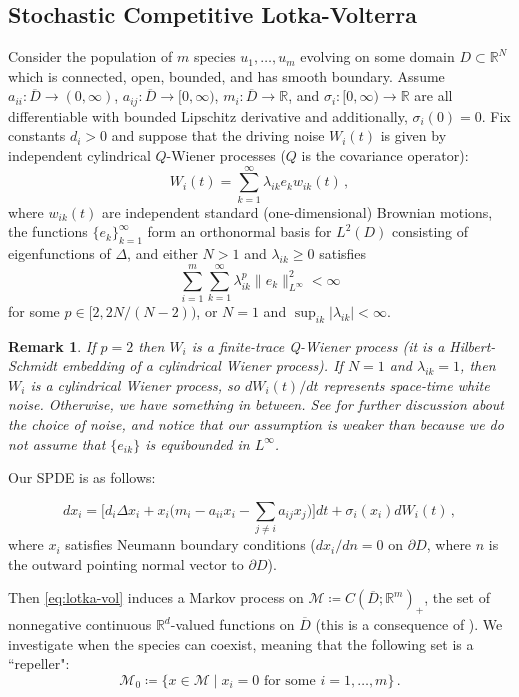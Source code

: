 \documentclass[final]{amsart}
\newtheorem{rem}[thm]{Remark}
\numberwithin{thm}{section}
\numberwithin{equation}{section}
\newcommand{\mcM}{\mathcal{M}}
\newcommand{\R}{\mathbb{R}}
\begin{document}
\subsection{Stochastic Competitive Lotka-Volterra}\label{sec:lotka-volterra}
Consider the population of $m$ species $u_1,\dots,u_m$ evolving on some domain $D \subset \R^N$ which is connected, open, bounded, and has smooth boundary. Assume $a_{ii}: \overline D \to (0,\infty)$, $a_{ij}: \overline D \to [0,\infty)$, $m_i: \overline D \to \R$, and $\sigma_i: [0,\infty) \to \R$ are all differentiable with bounded Lipschitz derivative and additionally, $\sigma_i(0) = 0$. Fix constants $d_i > 0$ and suppose that the driving noise $W_i(t)$ is given by independent cylindrical $Q$-Wiener processes ($Q$ is the covariance operator):
$$W_i(t) = \sum_{k = 1}^\infty \lambda_{ik}e_kw_{ik}(t) \,,$$
where $w_{ik}(t)$ are independent standard (one-dimensional) Brownian motions, the functions $\{e_k\}_{k = 1}^\infty$ form an orthonormal basis for $L^2(D)$ consisting of eigenfunctions of $\Delta$, and either $N>1$ and $\lambda_{ik} \geq 0$ satisfies
$$\sum_{i=1}^m\sum_{k=1}^\infty \lambda_{ik}^p\|e_k\|_{L^\infty}^2 < \infty$$
for some $p \in [2,2N/(N-2))$, or $N=1$ and $\sup_{ik} |\lambda_{ik}| < \infty$.

\begin{rem}
If $p = 2$ then $W_i$ is a finite-trace Q-Wiener process (it is a Hilbert-Schmidt embedding of a cylindrical Wiener process). If $N = 1$ and $\lambda_{ik} = 1$, then $W_i$ is a cylindrical Wiener process, so $dW_i(t)/dt$ represents space-time white noise. Otherwise, we have something in between. See \cite[Section 8]{stochastic-lotka-volterra-SPDE} for further discussion about the choice of noise, and notice that our assumption is weaker than \cite[Hypothesis 8.1]{stochastic-lotka-volterra-SPDE} because we do not assume that $\{e_{ik}\}$ is equibounded in $L^\infty$.
\end{rem}

Our SPDE is as follows:

\begin{equation}\label{eq:lotka-vol}
    dx_i = \Big[d_i\Delta x_i + x_i\Big(m_i - a_{ii}x_i - \sum_{j \neq i}a_{ij} x_j\Big)\Big]dt + \sigma_i(x_i)dW_i(t) \,,
\end{equation}
where $x_i$ satisfies Neumann boundary conditions ($dx_i/dn = 0$ on $\partial D$, where $n$ is the outward pointing normal vector to $\partial D$).

Then \eqref{eq:lotka-vol} induces a Markov process on $\mcM \coloneqq C(\overline D;\R^m)_+$, the set of nonnegative continuous $\R^d$-valued functions on $\overline D$ (this is a consequence of ). We investigate when the species can coexist, meaning that the following set is a ``repeller":
$$\mcM_0 \coloneqq \{x \in \mcM \mid x_i = 0 \text{ for some } i = 1,\dots,m\} \,.$$
\end{document}
